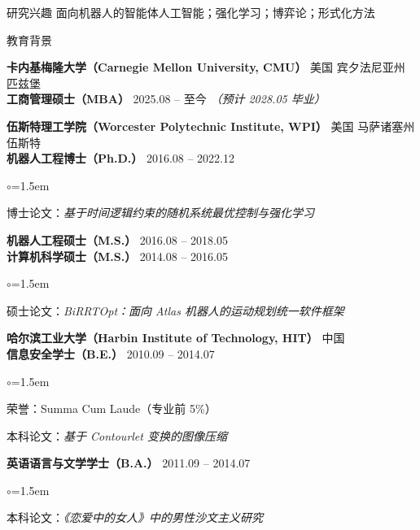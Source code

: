 \documentclass{resume}
\begin{document}
\small



\begin{rSection}{研究兴趣}
面向机器人的智能体人工智能；强化学习；博弈论；形式化方法
\end{rSection}

\begin{rSection}{教育背景}

{\bf 卡内基梅隆大学（Carnegie Mellon University, CMU）} \hfill 美国 宾夕法尼亚州 匹兹堡 \\
{\bf 工商管理硕士（MBA）} \hfill 2025.08 -- 至今 {\em（预计 2028.05 毕业）}

{\bf 伍斯特理工学院（Worcester Polytechnic Institute, WPI）} \hfill 美国 马萨诸塞州 伍斯特 \\
{\bf 机器人工程博士（Ph.D.）} \hfill 2016.08 -- 2022.12
\begin{list}{$\circ$}{\leftmargin=1.5em}
\item 博士论文：\textit{基于时间逻辑约束的随机系统最优控制与强化学习}
\end{list}

{\bf 机器人工程硕士（M.S.）} \hfill 2016.08 -- 2018.05 \\

{\bf 计算机科学硕士（M.S.）} \hfill 2014.08 -- 2016.05
\begin{list}{$\circ$}{\leftmargin=1.5em}
\item 硕士论文：\textit{BiRRTOpt：面向 Atlas 机器人的运动规划统一软件框架}
\end{list}

{\bf 哈尔滨工业大学（Harbin Institute of Technology, HIT）} \hfill 中国 \\
{\bf 信息安全学士（B.E.）} \hfill 2010.09 -- 2014.07
\begin{list}{$\circ$}{\leftmargin=1.5em}
\item 荣誉：Summa Cum Laude（专业前 5\%）
\item 本科论文：\textit{基于 Contourlet 变换的图像压缩}
\end{list}

{\bf 英语语言与文学学士（B.A.）} \hfill 2011.09 -- 2014.07
\begin{list}{$\circ$}{\leftmargin=1.5em}
\item 本科论文：\textit{《恋爱中的女人》中的男性沙文主义研究}
\end{list}

\end{rSection}
\end{document}
